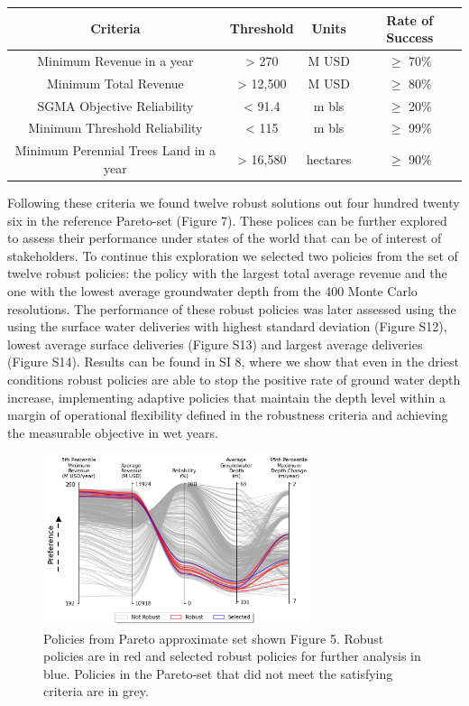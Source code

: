 \documentclass[11pt,a4paper]{article}
\begin{document}
\begin{center}
\begin{tabular}{ |c|c|c|c| }
 \hline
 Criteria  & Threshold & Units & Rate of Success \\ 
 \hline
Minimum Revenue in a year  & > 270 & M USD & $\geq$ 70\% \\
Minimum Total Revenue   & > 12,500 & M USD & $\geq$ 80\% \\
SGMA Objective Reliability & < 91.4 & m bls & $\geq$ 20\%  \\
Minimum Threshold Reliability  & < 115 & m bls & $\geq$ 99\%  \\
Minimum Perennial Trees Land in a year  & > 16,580 & hectares & $\geq$ 90\%  \\
\hline
\end{tabular}
\end{center}

Following these criteria we found twelve robust solutions out four hundred twenty six in the reference Pareto-set (Figure 7). These polices can be further explored to assess their performance under states of the world that can be of interest of stakeholders. To continue this exploration we selected two policies from the set of twelve robust policies: the policy with the largest total average revenue and the one with the lowest average groundwater depth from the 400 Monte Carlo resolutions. The performance of these robust policies was later assessed using the using the surface water deliveries with highest standard deviation (Figure S12), lowest average surface deliveries (Figure S13) and largest average deliveries (Figure S14). Results can be found in SI 8, where we show that even in the driest conditions robust policies are able to stop the positive rate of ground water depth increase, implementing adaptive policies that maintain the depth level within a margin of operational flexibility defined in the robustness criteria and achieving the measurable objective in wet years. 

\begin{figure}[H]
    \centering
    \includegraphics[width=0.7\textwidth]{robust_policies_parallel_axis.png}
    \caption{Policies from Pareto approximate set shown Figure 5. Robust policies are in red and selected robust policies for further analysis in blue. Policies in the Pareto-set that did not meet the satisfying criteria are in grey.} \label{fig:parallel_robustness}
\end{figure}
\end{document}
